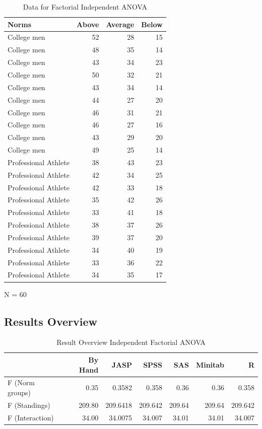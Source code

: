 \documentclass[
]{book}
\begin{document}
\begin{table}

\caption{\label{tab:unnamed-chunk-43}Data for Factorial Independent ANOVA}
\centering
\begin{tabular}[t]{lrrr}
\toprule
Norms & Above & Average & Below\\
\midrule
College men & 52 & 28 & 15\\
College men & 48 & 35 & 14\\
College men & 43 & 34 & 23\\
College men & 50 & 32 & 21\\
College men & 43 & 34 & 14\\
\addlinespace
College men & 44 & 27 & 20\\
College men & 46 & 31 & 21\\
College men & 46 & 27 & 16\\
College men & 43 & 29 & 20\\
College men & 49 & 25 & 14\\
\addlinespace
Professional Athlete & 38 & 43 & 23\\
Professional Athlete & 42 & 34 & 25\\
Professional Athlete & 42 & 33 & 18\\
Professional Athlete & 35 & 42 & 26\\
Professional Athlete & 33 & 41 & 18\\
\addlinespace
Professional Athlete & 38 & 37 & 26\\
Professional Athlete & 39 & 37 & 20\\
Professional Athlete & 34 & 40 & 19\\
Professional Athlete & 33 & 36 & 22\\
Professional Athlete & 34 & 35 & 17\\
\bottomrule
\end{tabular}
\end{table}

N = 60

\hypertarget{results-overview-1}{%
\subsection{Results Overview}\label{results-overview-1}}

\begin{table}

\caption{\label{tab:unnamed-chunk-44}Result Overview Independent Factorial ANOVA}
\centering
\begin{tabular}[t]{lrrrrrr}
\toprule
  & By Hand & JASP & SPSS & SAS & Minitab & R\\
\midrule
F (Norm groups) & 0.35 & 0.3582 & 0.358 & 0.36 & 0.36 & 0.358\\
F (Standings) & 209.80 & 209.6418 & 209.642 & 209.64 & 209.64 & 209.642\\
F (Interaction) & 34.00 & 34.0075 & 34.007 & 34.01 & 34.01 & 34.007\\
\bottomrule
\end{tabular}
\end{table}
\end{document}
